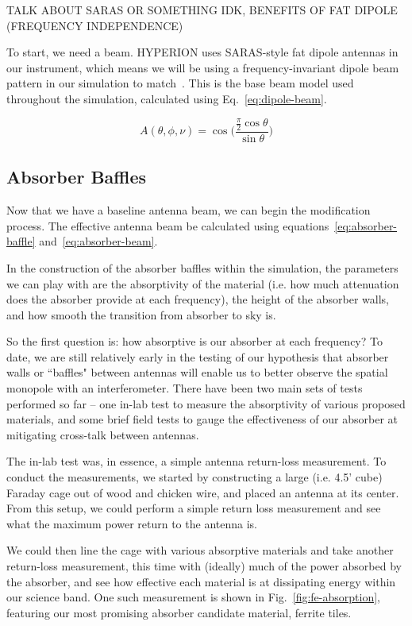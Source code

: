 TALK ABOUT SARAS OR SOMETHING IDK, BENEFITS OF FAT DIPOLE (FREQUENCY 
INDEPENDENCE)

To start, we need a beam. HYPERION uses SARAS-style fat dipole antennas in our 
instrument, which means we will be using a frequency-invariant dipole beam 
pattern in our simulation to match~\citep{patra2013}. This is the base beam 
model used throughout the simulation, calculated using 
Eq.~\eqref{eq:dipole-beam}.

\begin{equation}
    \label{eq:dipole-beam}
    A(\theta, \phi, \nu) = \cos\Big(\frac{\frac{\pi}{2} 
    \cos{\theta}}{\sin{\theta}}\Big)
\end{equation}

\subsection{Absorber Baffles}

Now that we have a baseline antenna beam, we can begin the modification 
process. The effective antenna beam be calculated using 
equations~\eqref{eq:absorber-baffle} and~\eqref{eq:absorber-beam}.

In the construction of the absorber baffles within the simulation, the 
parameters we can play with are the absorptivity of the material (i.e.  how 
much attenuation does the absorber provide at each frequency), the height of 
the absorber walls, and how smooth the transition from absorber to sky is.  

So the first question is: how absorptive is our absorber at each frequency? To 
date, we are still relatively early in the testing of our hypothesis that 
absorber walls or ``baffles" between antennas will enable us to better observe 
the spatial monopole with an interferometer.  There have been two main sets of 
tests performed so far -- one in-lab test to measure the absorptivity of 
various proposed materials, and some brief field tests to gauge the 
effectiveness of our absorber at mitigating cross-talk between antennas.

The in-lab test was, in essence, a simple antenna return-loss measurement. To 
conduct the measurements, we started by constructing a large (i.e. 4.5' cube) 
Faraday cage out of wood and chicken wire, and placed an antenna at its center.  
From this setup, we could perform a simple return loss measurement and see what 
the maximum power return to the antenna is.

We could then line the cage with various absorptive materials and take another 
return-loss measurement, this time with (ideally) much of the power absorbed by 
the absorber, and see how effective each material is at dissipating energy 
within our science band. One such measurement is shown in 
Fig.~\ref{fig:fe-absorption}, featuring our most promising absorber candidate 
material, ferrite tiles.

